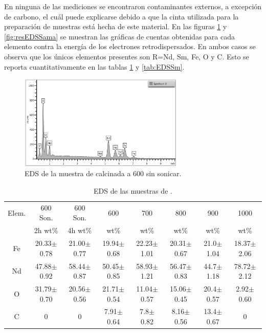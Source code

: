 \documentclass[../main.tex]{subfiles}
\begin{document}
En ninguna de las mediciones se encontraron contaminantes externos, a excepción de carbono, el cuál puede explicarse debido a que la cinta utilizada para la preparación de muestras está hecha de este material. En las figuras  \ref{fig:resEDSNeod} y \ref{fig:resEDSSama} se muestran las gráficas de cuentas obtenidas para cada elemento contra la energía de los electrones retrodispersados. En ambos casos se observa que los únicos elementos presentes son R=Nd, Sm, Fe, O y C. Esto se reporta cuantitativamente en las tablas \ref{tab:EDSNd} y \ref{tab:EDSSm}.
\begin{figure}[H]
    \centering
    \includegraphics[width=0.7\textwidth]{fig/resEDSNeod.png}
    \caption{EDS de la muestra de \neod{} calcinada a 600\gradoC{} sin sonicar.}
    \label{fig:resEDSNeod}
\end{figure}
\begin{table}[H]
    \begin{tabular}{|c||c|c|c|c|c|c|c|}
        \hline
        Elem. &600\gradoC{} Son.&600\gradoC{} Son.&600\gradoC{}&700\gradoC{}&800\gradoC{}&900\gradoC{}&1000\gradoC{}\\
        &2h wt\%&4h wt\%&wt\%&wt\%&wt\%&wt\%&wt\%\\
        \hline\hline
        Fe & 20.33$\pm$0.78 &21.00$\pm$0.77& 19.94$\pm$0.68 & 22.23$\pm$1.01 & 20.31$\pm$0.67 & 21.0$\pm$1.04 & 18.37$\pm$2.06 \\
        Nd & 47.88$\pm$0.92 &58.44$\pm$0.87& 50.45$\pm$0.85 & 58.93$\pm$1.21 & 56.47$\pm$0.83 & 44.7$\pm$1.18 & 78.72$\pm$2.12 \\
        O & 31.79$\pm$0.70 &20.56$\pm$0.56& 21.71$\pm$0.54 & 11.04$\pm$0.57 & 15.06$\pm$0.45 & 20.4$\pm$0.57 & 2.92$\pm$0.60 \\
        C & 0 & 0 & 7.91$\pm$0.64 & 7.8$\pm$0.82 & 8.16$\pm$0.56 & 13.4$\pm$0.67 &0 \\ 
        \hline
        \end{tabular} 
            \caption{EDS de las muestras de \neod{}.}
            \label{tab:EDSNd}
        \end{table}
\end{document}
